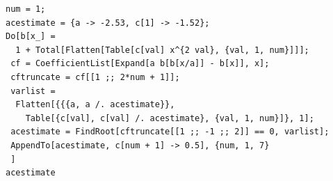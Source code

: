\documentclass[12pt,letterpaper,noanswers]{exam}
\begin{document}
\begin{questions}
\begin{verbatim}
num = 1;
acestimate = {a -> -2.53, c[1] -> -1.52};
Do[b[x_] = 
  1 + Total[Flatten[Table[c[val] x^{2 val}, {val, 1, num}]]];
 cf = CoefficientList[Expand[a b[b[x/a]] - b[x]], x];
 cftruncate = cf[[1 ;; 2*num + 1]];
 varlist = 
  Flatten[{{{a, a /. acestimate}}, 
    Table[{c[val], c[val] /. acestimate}, {val, 1, num}]}, 1];
 acestimate = FindRoot[cftruncate[[1 ;; -1 ;; 2]] == 0, varlist]; 
 AppendTo[acestimate, c[num + 1] -> 0.5], {num, 1, 7}
 ]
acestimate
\end{verbatim}


\end{questions}
\end{document}
